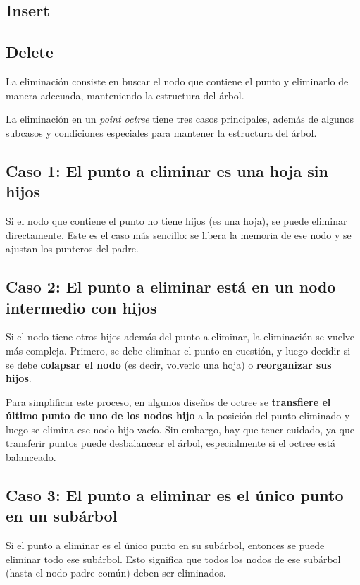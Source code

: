 \documentclass{article}
\begin{document}
\subsection{Insert}

\subsection{Delete}
La eliminación consiste en buscar el nodo que contiene el punto y eliminarlo de manera adecuada, manteniendo la estructura del árbol.

La eliminación en un \textit{point octree} tiene tres casos principales, además de algunos subcasos y condiciones especiales para mantener la estructura del árbol.

\subsection*{Caso 1: El punto a eliminar es una hoja sin hijos}
Si el nodo que contiene el punto no tiene hijos (es una hoja), se puede eliminar directamente. Este es el caso más sencillo: se libera la memoria de ese nodo y se ajustan los punteros del padre.

\subsection*{Caso 2: El punto a eliminar está en un nodo intermedio con hijos}
Si el nodo tiene otros hijos además del punto a eliminar, la eliminación se vuelve más compleja. Primero, se debe eliminar el punto en cuestión, y luego decidir si se debe \textbf{colapsar el nodo} (es decir, volverlo una hoja) o \textbf{reorganizar sus hijos}.

Para simplificar este proceso, en algunos diseños de octree se \textbf{transfiere el último punto de uno de los nodos hijo} a la posición del punto eliminado y luego se elimina ese nodo hijo vacío. Sin embargo, hay que tener cuidado, ya que transferir puntos puede desbalancear el árbol, especialmente si el octree está balanceado.

\subsection*{Caso 3: El punto a eliminar es el único punto en un subárbol}
Si el punto a eliminar es el único punto en su subárbol, entonces se puede eliminar todo ese subárbol. Esto significa que todos los nodos de ese subárbol (hasta el nodo padre común) deben ser eliminados.
\end{document}
